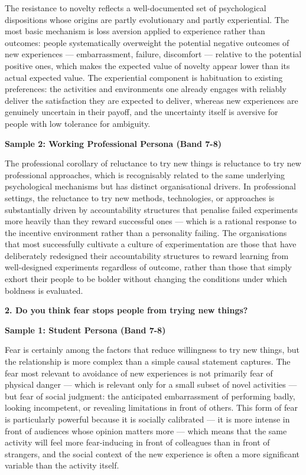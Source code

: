 The resistance to novelty reflects a well-documented set of psychological dispositions whose origins are partly evolutionary and partly experiential. The most basic mechanism is loss aversion applied to experience rather than outcomes: people systematically overweight the potential negative outcomes of new experiences — embarrassment, failure, discomfort — relative to the potential positive ones, which makes the expected value of novelty appear lower than its actual expected value. The experiential component is habituation to existing preferences: the activities and environments one already engages with reliably deliver the satisfaction they are expected to deliver, whereas new experiences are genuinely uncertain in their payoff, and the uncertainty itself is aversive for people with low tolerance for ambiguity.

\textbf{Sample 2: Working Professional Persona (Band 7-8)}

The professional corollary of reluctance to try new things is reluctance to try new professional approaches, which is recognisably related to the same underlying psychological mechanisms but has distinct organisational drivers. In professional settings, the reluctance to try new methods, technologies, or approaches is substantially driven by accountability structures that penalise failed experiments more heavily than they reward successful ones — which is a rational response to the incentive environment rather than a personality failing. The organisations that most successfully cultivate a culture of experimentation are those that have deliberately redesigned their accountability structures to reward learning from well-designed experiments regardless of outcome, rather than those that simply exhort their people to be bolder without changing the conditions under which boldness is evaluated.

\separator

\begin{ieltsquestion}
\textbf{2. Do you think fear stops people from trying new things?}
\end{ieltsquestion}
\textbf{Sample 1: Student Persona (Band 7-8)}

Fear is certainly among the factors that reduce willingness to try new things, but the relationship is more complex than a simple causal statement captures. The fear most relevant to avoidance of new experiences is not primarily fear of physical danger — which is relevant only for a small subset of novel activities — but fear of social judgment: the anticipated embarrassment of performing badly, looking incompetent, or revealing limitations in front of others. This form of fear is particularly powerful because it is socially calibrated — it is more intense in front of audiences whose opinion matters more — which means that the same activity will feel more fear-inducing in front of colleagues than in front of strangers, and the social context of the new experience is often a more significant variable than the activity itself.


